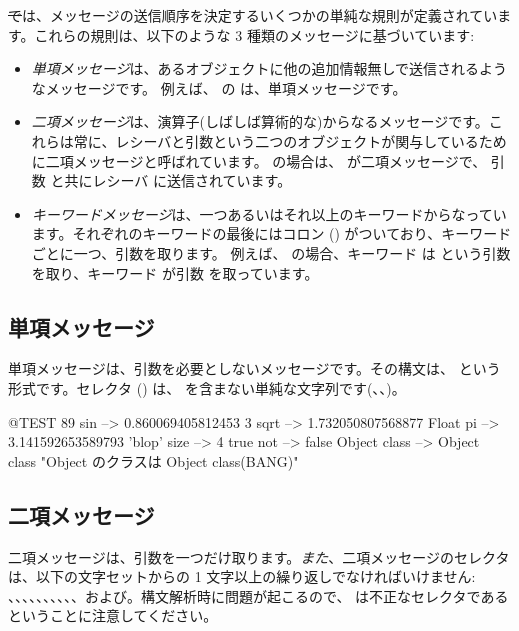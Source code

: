 \documentclass[a4paper,10pt,twoside]{book}
\begin{document}
\st では、メッセージの送信順序を決定するいくつかの単純な規則が定義されています。これらの規則は、以下のような 3 種類のメッセージに基づいています:
\begin{itemize}
\item \emph{単項メッセージ}は、あるオブジェクトに他の追加情報無しで送信されるようなメッセージです。 例えば、 の  は、単項メッセージです。
\item  \emph{二項メッセージ}は、演算子(しばしば算術的な)からなるメッセージです。これらは常に、レシーバと引数という二つのオブジェクトが関与しているために二項メッセージと呼ばれています。 の場合は、\ct{+} が二項メッセージで、 引数  と共にレシーバ  に送信されています。
\item  \emph{キーワードメッセージ}は、一つあるいはそれ以上のキーワードからなっています。それぞれのキーワードの最後にはコロン (\ct{:}) がついており、キーワードごとに一つ、引数を取ります。
例えば、 の場合、キーワード  は  という引数を取り、キーワード  が引数  を取っています。
\end{itemize}

\subsection{単項メッセージ}
単項メッセージは、引数を必要としないメッセージです。その構文は、 という形式です。セレクタ () は、\ct{:} を含まない単純な文字列です(\eg {}、、)。
\begin{code}{@TEST}
89 sin           --> 0.860069405812453
3 sqrt           --> 1.732050807568877
Float pi         --> 3.141592653589793
'blop' size     --> 4
true not        --> false
Object class --> Object class  "Object のクラスは Object class(BANG)"
\end{code}


\subsection{二項メッセージ} 
二項メッセージは、引数を一つだけ取ります。\emph{また}、二項メッセージのセレクタは、以下の文字セットからの 1 文字以上の繰り返しでなければいけません: \ct{+}、\ct{-}、\ct{*}、\ct{/}、\ct{\&}、\ct{=}、\ct{>}、\ct{|}、\ct{<}、\ct{\~}、および。構文解析時に問題が起こるので、\ct{--} は不正なセレクタであるということに注意してください。
\end{document}
